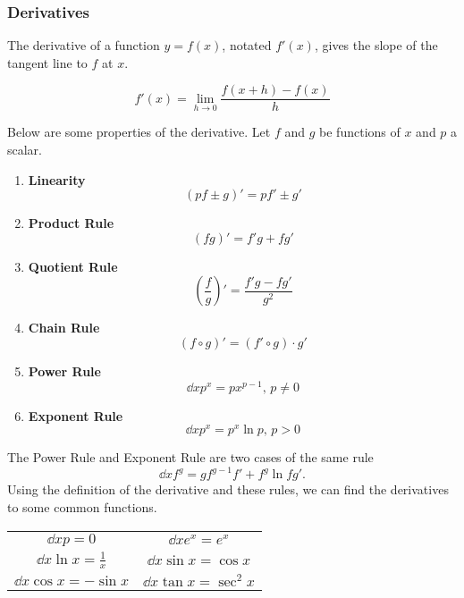 \subsubsection{Derivatives}
The derivative of a function $y = f(x)$, notated $f'(x)$, gives the slope of the tangent line to $f$ at $x$.
\begin{definition}
	\begin{equation*}
		f'(x) = \lim\limits_{h \to 0}{\frac{f(x+h) - f(x)}{h}}
	\end{equation*}
\end{definition}

\noindent
Below are some properties of the derivative. Let $f$ and $g$ be functions of $x$ and $p$ a scalar.
\begin{enumerate}[label=]
	\item \textbf{Linearity}
	\begin{equation*}
		\left( pf \pm g \right)' = pf' \pm g'
	\end{equation*}
	\item \textbf{Product Rule}
	\begin{equation*}
		\left( fg \right)' = f'g + fg'
	\end{equation*}
	\item \textbf{Quotient Rule}
	\begin{equation*}
		\left( \frac{f}{g} \right)' = \frac{f'g - fg'}{g^2}
	\end{equation*}
	\item \textbf{Chain Rule}
	\begin{equation*}
		\left( f \circ g \right)' = \left( f' \circ g \right) \cdot g'
	\end{equation*}
	\item \textbf{Power Rule}
	\begin{equation*}
		\dd{x} p^x = px^{p-1} \text{, } p \neq 0
	\end{equation*}
	\item \textbf{Exponent Rule}
	\begin{equation*}
		\dd{x} p^x = p^x \ln{p} \text{, } p > 0
	\end{equation*}
\end{enumerate}
The Power Rule and Exponent Rule are two cases of the same rule
\begin{equation*}
	\dd{}{x} f^g = gf^{g-1}f' + f^g\ln{f}g'.
\end{equation*}
Using the definition of the derivative and these rules, we can find the derivatives to some common functions.
\begin{center}
	\begin{tabular}{c | c}
		\large{$\dd{}{x} p = 0$} 				& \large{$\dd{}{x} e^x = e^x$} 			\\ [0.75em]
		\large{$\dd{}{x} \ln{x} = \frac{1}{x}$} & \large{$\dd{}{x} \sin{x} = \cos{x}$} 	\\ [0.75em]
		\large{$\dd{}{x} \cos{x} = -\sin{x}$} 	& \large{$\dd{}{x} \tan{x} = \sec^2{x}$}
	\end{tabular}
\end{center}
